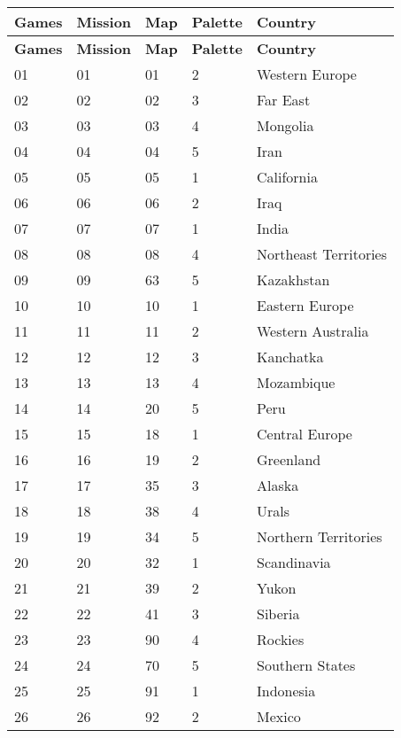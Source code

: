\documentclass[a4paper,twoside,12pt,dvips]{article}
\begin{document}
\begin{center}
  \begin{longtable}{|l|l|l|l|l|}

    \hline \textbf{Games} & \textbf{Mission} & \textbf{Map} & \textbf{Palette} & \textbf{Country} \\ \hline 
    \endfirsthead

    \hline \textbf{Games} & \textbf{Mission} & \textbf{Map} & \textbf{Palette} & \textbf{Country} \\ \hline 
    \endhead

01 & 01 & 01 & 2 & Western Europe \\
\hline
02 & 02 & 02 & 3 & Far East \\
\hline
03 & 03 & 03 & 4 & Mongolia \\
\hline
04 & 04 & 04 & 5 & Iran \\
\hline
05 & 05 & 05 & 1 & California \\
\hline
06 & 06 & 06 & 2 & Iraq \\
\hline
07 & 07 & 07 & 1 & India \\
\hline
08 & 08 & 08 & 4 & Northeast Territories \\
\hline
09 & 09 & 63 & 5 & Kazakhstan \\
\hline
10 & 10 & 10 & 1 & Eastern Europe \\
\hline
11 & 11 & 11 & 2 & Western Australia \\
\hline
12 & 12 & 12 & 3 & Kanchatka \\
\hline
13 & 13 & 13 & 4 & Mozambique \\
\hline
14 & 14 & 20 & 5 & Peru \\
\hline
15 & 15 & 18 & 1 & Central Europe \\
\hline
16 & 16 & 19 & 2 & Greenland \\
\hline
17 & 17 & 35 & 3 & Alaska \\
\hline
18 & 18 & 38 & 4 & Urals \\
\hline
19 & 19 & 34 & 5 & Northern Territories \\
\hline
20 & 20 & 32 & 1 & Scandinavia \\
\hline
21 & 21 & 39 & 2 & Yukon \\
\hline
22 & 22 & 41 & 3 & Siberia \\
\hline
23 & 23 & 90 & 4 & Rockies \\
\hline
24 & 24 & 70 & 5 & Southern States \\
\hline
25 & 25 & 91 & 1 & Indonesia \\
\hline
26 & 26 & 92 & 2 & Mexico \\

\end{longtable}
\end{center}
\end{document}

